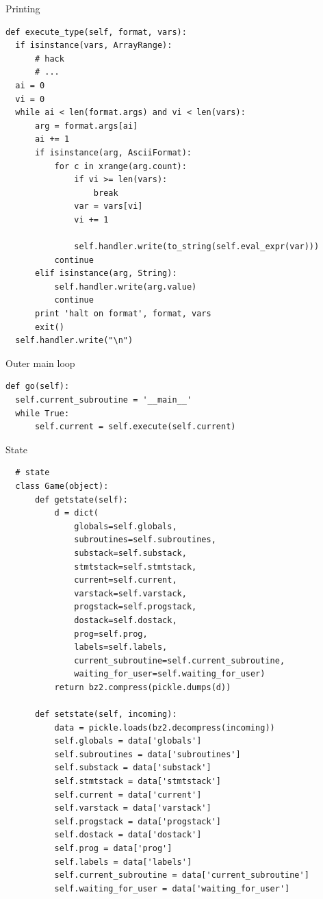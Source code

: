\documentclass{beamer}
\def\py{
  \lstset{
     language=Python,
     extendedchars=true,
     basicstyle=\footnotesize\ttfamily,
     showstringspaces=false,
     showspaces=false,
     numbersep=9pt,
     tabsize=2,
     breaklines=true,
     showtabs=false,
     captionpos=b
  }
}
\begin{document}
\begin{frame}[fragile]{Printing}
\py
\begin{lstlisting}
def execute_type(self, format, vars):
  if isinstance(vars, ArrayRange):
      # hack
      # ...
  ai = 0
  vi = 0
  while ai < len(format.args) and vi < len(vars):
      arg = format.args[ai]
      ai += 1
      if isinstance(arg, AsciiFormat):
          for c in xrange(arg.count):
              if vi >= len(vars):
                  break
              var = vars[vi]
              vi += 1

              self.handler.write(to_string(self.eval_expr(var)))
          continue
      elif isinstance(arg, String):
          self.handler.write(arg.value)
          continue
      print 'halt on format', format, vars
      exit()
  self.handler.write("\n")
\end{lstlisting}
\end{frame}

\begin{frame}[fragile]{Outer main loop}
\py
\begin{lstlisting}
def go(self):
  self.current_subroutine = '__main__'
  while True:
      self.current = self.execute(self.current)

\end{lstlisting}
\end{frame}

\begin{frame}[fragile]{State}
\py
\begin{lstlisting}
  # state
  class Game(object):
      def getstate(self):
          d = dict(
              globals=self.globals,
              subroutines=self.subroutines,
              substack=self.substack,
              stmtstack=self.stmtstack,
              current=self.current,
              varstack=self.varstack,
              progstack=self.progstack,
              dostack=self.dostack,
              prog=self.prog,
              labels=self.labels,
              current_subroutine=self.current_subroutine,
              waiting_for_user=self.waiting_for_user)
          return bz2.compress(pickle.dumps(d))

      def setstate(self, incoming):
          data = pickle.loads(bz2.decompress(incoming))
          self.globals = data['globals']
          self.subroutines = data['subroutines']
          self.substack = data['substack']
          self.stmtstack = data['stmtstack']
          self.current = data['current']
          self.varstack = data['varstack']
          self.progstack = data['progstack']
          self.dostack = data['dostack']
          self.prog = data['prog']
          self.labels = data['labels']
          self.current_subroutine = data['current_subroutine']
          self.waiting_for_user = data['waiting_for_user']
\end{lstlisting}
\end{frame}
\end{document}
